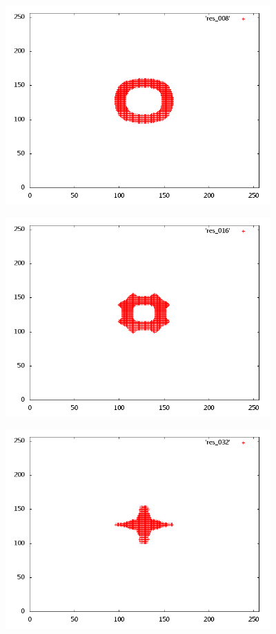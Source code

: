 \begin{center}
\includegraphics[width=4in]{res_008.png}
\end{center}
\begin{center}
\includegraphics[width=4in]{res_016.png}
\end{center}
\begin{center}
\includegraphics[width=4in]{res_032.png}
\end{center}
